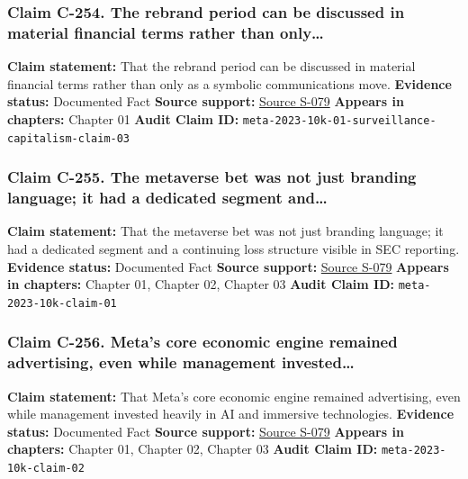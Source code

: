 \documentclass[
  american,
  11pt,
  letterpaper,
]{article}
\begin{document}
\subsubsection{Claim C-254. The rebrand period can be discussed in
material financial terms rather than
only\ldots{}}\label{claim-c-254-the-rebrand-period-can-be-discussed-in-material-financial-terms-rather-than-only}

\textbf{Claim statement:} That the rebrand period can be discussed in
material financial terms rather than only as a symbolic communications
move. \textbf{Evidence status:} Documented Fact \textbf{Source support:}
\hyperref[source-s-079-meta-platforms-inc-2023-annual-report-form-10-k]{Source
S-079} \textbf{Appears in chapters:} Chapter 01 \textbf{Audit Claim ID:}
\texttt{meta-2023-10k-01-surveillance-capitalism-claim-03}

\subsubsection{Claim C-255. The metaverse bet was not just branding
language; it had a dedicated segment
and\ldots{}}\label{claim-c-255-the-metaverse-bet-was-not-just-branding-language-it-had-a-dedicated-segment-and}

\textbf{Claim statement:} That the metaverse bet was not just branding
language; it had a dedicated segment and a continuing loss structure
visible in SEC reporting. \textbf{Evidence status:} Documented Fact
\textbf{Source support:}
\hyperref[source-s-079-meta-platforms-inc-2023-annual-report-form-10-k]{Source
S-079} \textbf{Appears in chapters:} Chapter 01, Chapter 02, Chapter 03
\textbf{Audit Claim ID:} \texttt{meta-2023-10k-claim-01}

\subsubsection{Claim C-256. Meta's core economic engine remained
advertising, even while management
invested\ldots{}}\label{claim-c-256-meta-s-core-economic-engine-remained-advertising-even-while-management-invested}

\textbf{Claim statement:} That Meta's core economic engine remained
advertising, even while management invested heavily in AI and immersive
technologies. \textbf{Evidence status:} Documented Fact \textbf{Source
support:}
\hyperref[source-s-079-meta-platforms-inc-2023-annual-report-form-10-k]{Source
S-079} \textbf{Appears in chapters:} Chapter 01, Chapter 02, Chapter 03
\textbf{Audit Claim ID:} \texttt{meta-2023-10k-claim-02}
\end{document}
